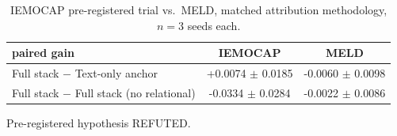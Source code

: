\begin{table}[t]
\centering
\caption{IEMOCAP pre-registered trial vs.\ MELD, matched attribution methodology, $n{=}3$ seeds each.}
\label{tab:iemocap-decisive}
\begin{tabular}{lcc}
\toprule
paired gain & IEMOCAP & MELD \\
\midrule
Full stack $-$ Text-only anchor & +0.0074 $\pm$ 0.0185 & -0.0060 $\pm$ 0.0098 \\
Full stack $-$ Full stack (no relational) & -0.0334 $\pm$ 0.0284 & -0.0022 $\pm$ 0.0086 \\
\bottomrule
\end{tabular}
\par\footnotesize Pre-registered hypothesis REFUTED.
\end{table}
